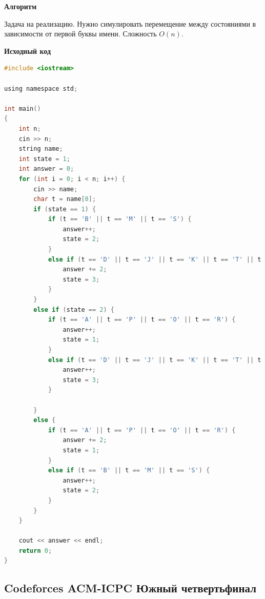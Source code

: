\documentclass[a4paper,12pt]{article}
\begin{document}
\textbf{{\large Алгоритм}}

Задача на реализацию. Нужно симулировать перемещение между состояниями в зависимости от первой буквы имени. Сложность $O(n)$.

\newpage
\textbf{{\large Исходный код}} \\
\begin{lstlisting}[language=C]
#include <iostream>

using namespace std;

int main()
{
    int n;
    cin >> n;
    string name;
    int state = 1;
    int answer = 0;
    for (int i = 0; i < n; i++) {
        cin >> name;
        char t = name[0];
        if (state == 1) {
            if (t == 'B' || t == 'M' || t == 'S') {
                answer++;
                state = 2;
            }
            else if (t == 'D' || t == 'J' || t == 'K' || t == 'T' || t == 'W' || t == 'G') {
                answer += 2;
                state = 3;
            }
        }
        else if (state == 2) {
            if (t == 'A' || t == 'P' || t == 'O' || t == 'R') {
                answer++;
                state = 1;
            }
            else if (t == 'D' || t == 'J' || t == 'K' || t == 'T' || t == 'W' || t == 'G') {
                answer++;
                state = 3;
            }

        }
        else {
            if (t == 'A' || t == 'P' || t == 'O' || t == 'R') {
                answer += 2;
                state = 1;
            }
            else if (t == 'B' || t == 'M' || t == 'S') {
                answer++;
                state = 2;
            }
        }
    }

    cout << answer << endl;
    return 0;
}
\end{lstlisting}



%
%
\newpage
\subsection{Codeforces ACM-ICPC Южный четвертьфинал}
\end{document}
